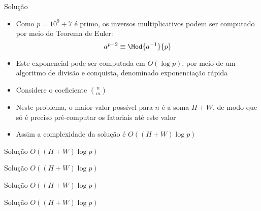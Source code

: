 \begin{frame}[fragile]{Solução}

    \begin{itemize}
        \item Como $p = 10^9 + 7$ é primo, os inversos multiplicativos podem ser computado por
            meio do Teorema de Euler:
        \[
            a^{p - 2} \equiv \Mod{a^{-1}}{p}
        \]

        \item Este exponencial pode ser computada em $O(\log p)$, por meio de um algoritmo de 
            divisão e conquista, denominado exponenciação rápida

        \item Considere o coeficiente $\binom{n}{m}$

        \item Neste problema, o maior valor possível para $n$ é a soma $H + W$, de modo que só 
            é preciso pré-computar os fatoriais até este valor

        \item Assim a complexidade da solução é $O((H + W)\log p)$
    \end{itemize}

\end{frame}
\begin{frame}[fragile]{Solução $O((H + W)\log p)$}
\end{frame}

\begin{frame}[fragile]{Solução $O((H + W)\log p)$}
\end{frame}

\begin{frame}[fragile]{Solução $O((H + W)\log p)$}
\end{frame}

\begin{frame}[fragile]{Solução $O((H + W)\log p)$}
\end{frame}
